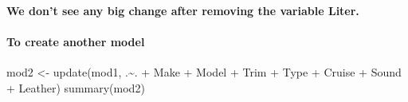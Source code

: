 \documentclass[
]{article}
\newenvironment{Shaded}{\begin{snugshade}}{\end{snugshade}}
\newcommand{\FunctionTok}[1]{\textcolor[rgb]{0.00,0.00,0.00}{#1}}
\newcommand{\NormalTok}[1]{#1}
\newcommand{\OtherTok}[1]{\textcolor[rgb]{0.56,0.35,0.01}{#1}}
\newcommand{\SpecialCharTok}[1]{\textcolor[rgb]{0.00,0.00,0.00}{#1}}
\begin{document}
\hypertarget{we-dont-see-any-big-change-after-removing-the-variable-liter.}{%
\paragraph{We don't see any big change after removing the variable
Liter.}\label{we-dont-see-any-big-change-after-removing-the-variable-liter.}}

\hypertarget{to-create-another-model}{%
\paragraph{To create another model}\label{to-create-another-model}}

\begin{Shaded}
\begin{Highlighting}[]
\NormalTok{mod2 }\OtherTok{\textless{}{-}} \FunctionTok{update}\NormalTok{(mod1, .}\SpecialCharTok{\textasciitilde{}}\NormalTok{. }\SpecialCharTok{+}\NormalTok{ Make }\SpecialCharTok{+}\NormalTok{ Model }\SpecialCharTok{+}\NormalTok{ Trim }\SpecialCharTok{+}\NormalTok{ Type }\SpecialCharTok{+}\NormalTok{ Cruise }\SpecialCharTok{+}\NormalTok{ Sound }\SpecialCharTok{+}\NormalTok{ Leather)}
\FunctionTok{summary}\NormalTok{(mod2)}
\end{Highlighting}
\end{Shaded}
\end{document}
